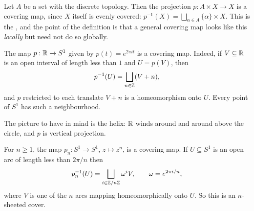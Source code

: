 \documentclass[a4paper]{scrartcl}
\begin{document}
\begin{example}
	Let $A$ be a set with the discrete topology. Then the projection $p: A \times X \to X$ is a covering map, since $X$ itself is evenly covered: $p^{-1}(X) = \bigsqcup_{\alpha \in A} \{\alpha\} \times X$. This is the , and the point of the definition is that a general covering map looks like this \emph{locally} but need not do so globally.
\end{example}

\begin{example} \label{ex:helix}
	The map $p: \mathbb{R} \to S^1$ given by $p(t) = e^{2\pi i t}$ is a covering map. Indeed, if $V \subseteq \mathbb{R}$ is an open interval of length less than $1$ and $U = p(V)$, then
	$$
	p^{-1}(U) = \bigsqcup_{n \in \mathbb{Z}} (V + n),
	$$
	and $p$ restricted to each translate $V + n$ is a homeomorphism onto $U$. Every point of $S^1$ has such a neighbourhood.
\end{example}

The picture to have in mind is the helix: $\mathbb{R}$ winds around and around above the circle,
and $p$ is vertical projection.

\begin{center}
\end{center}

\begin{example} \label{ex:zn-cover}
	For $n \geq 1$, the map $p_n: S^1 \to S^1$, $z \mapsto z^n$, is a covering map. If $U \subseteq S^1$ is an open arc of length less than $2\pi/n$ then
	$$
	p_n^{-1}(U) = \bigsqcup_{i \in \mathbb{Z}/n\mathbb{Z}} \omega^i V, \qquad \omega = e^{2\pi i /n},
	$$
	where $V$ is one of the $n$ arcs mapping homeomorphically onto $U$. So this is an $n$-sheeted cover.
\end{example}
\end{document}
